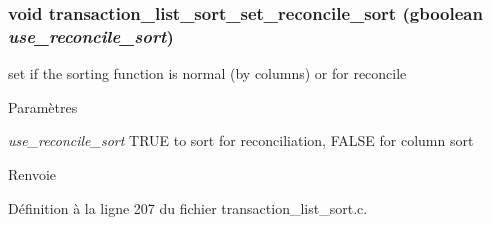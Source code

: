 \subsubsection[{transaction\_\-list\_\-sort\_\-set\_\-reconcile\_\-sort}]{\setlength{\rightskip}{0pt plus 5cm}void transaction\_\-list\_\-sort\_\-set\_\-reconcile\_\-sort (gboolean {\em use\_\-reconcile\_\-sort})}\label{transaction__list__sort_8h_aa6a0e83f7d489f7a8cf4e0083d5c2360}
set if the sorting function is normal (by columns) or for reconcile


\begin{DoxyParams}{Paramètres}
\item[{\em use\_\-reconcile\_\-sort}]TRUE to sort for reconciliation, FALSE for column sort\end{DoxyParams}
\begin{DoxyReturn}{Renvoie}

\end{DoxyReturn}


Définition à la ligne 207 du fichier transaction\_\-list\_\-sort.c.


